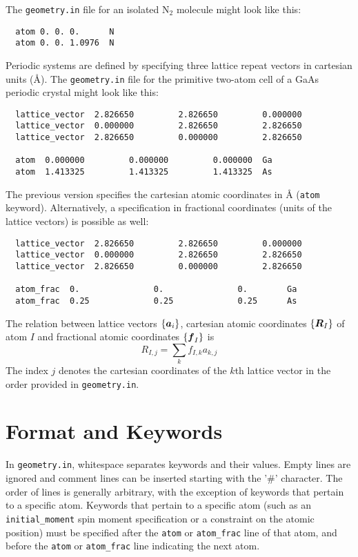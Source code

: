 \documentclass[11pt,letterpaper]{article}
\newcommand{\bolda}{\mbox{\boldmath$a$}}
\newcommand{\boldf}{\mbox{\boldmath$f$}}
\newcommand{\boldR}{\mbox{\boldmath$R$}}
\begin{document}
The \texttt{geometry.in} file for an isolated N$_2$ molecule might look like
this:

\begin{verbatim}
  atom 0. 0. 0.      N
  atom 0. 0. 1.0976  N
\end{verbatim}
 
Periodic systems are defined by specifying three lattice repeat vectors
in cartesian units ({\AA}). The \texttt{geometry.in} file for the
primitive two-atom cell of a GaAs periodic crystal might look like
this: 

\begin{verbatim}
  lattice_vector  2.826650         2.826650         0.000000
  lattice_vector  0.000000         2.826650         2.826650
  lattice_vector  2.826650         0.000000         2.826650

  atom  0.000000         0.000000         0.000000  Ga
  atom  1.413325         1.413325         1.413325  As
\end{verbatim}

The previous version specifies the cartesian atomic coordinates in
{\AA} (\texttt{atom} keyword). Alternatively, a specification in 
fractional coordinates (units of the lattice vectors) is possible as
well: 

\begin{verbatim}
  lattice_vector  2.826650         2.826650         0.000000
  lattice_vector  0.000000         2.826650         2.826650
  lattice_vector  2.826650         0.000000         2.826650

  atom_frac  0.               0.               0.        Ga
  atom_frac  0.25             0.25             0.25      As
\end{verbatim}

The relation between lattice vectors $\{\bolda_i\}$, cartesian
atomic coordinates $\{\boldR_I\}$ of atom $I$ and fractional atomic
coordinates $\{\boldf_I\}$ is
\begin{equation}
  R_{I,j} = \sum_k f_{I,k} a_{k,j}
\end{equation}
The index $j$ denotes the cartesian coordinates of the $k$th lattice
vector in the order provided in \texttt{geometry.in}.

\section{Format and Keywords}

In \texttt{geometry.in}, whitespace separates keywords and their
values. Empty lines are ignored and comment lines can be inserted
starting with the '\#' character. The order of lines is generally
arbitrary, with the exception of keywords that pertain to a specific
atom. Keywords that pertain to a specific atom (such as an
\texttt{initial\_moment} spin moment specification or a constraint on
the atomic position) must be specified after the \texttt{atom} or
\texttt{atom\_frac} line of that atom, and before the \texttt{atom} or
\texttt{atom\_frac} line indicating the next atom. \\[1.0ex]
\end{document}
